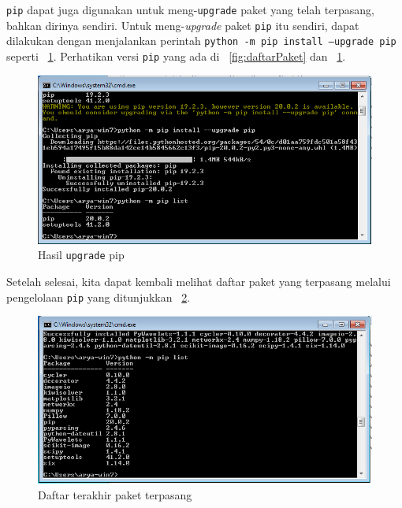\texttt{pip} dapat juga digunakan untuk meng-\texttt{upgrade} paket yang telah terpasang, bahkan dirinya sendiri. Untuk meng-\textit{upgrade} paket \texttt{pip} itu sendiri, dapat dilakukan dengan menjalankan perintah \texttt{python -m pip install --upgrade pip} seperti \figurename~\ref{fig:pipUpgrade}. Perhatikan versi \texttt{pip} yang ada di \figurename~\ref{fig:daftarPaket} dan \figurename~\ref{fig:pipUpgrade}.
 
\begin{figure}
  \begin{center}
    \includegraphics[scale=.5]{pics/pipList2.png}
    \caption{Hasil \texttt{upgrade} pip}
    \label{fig:pipUpgrade}
  \end{center}
\end{figure}


Setelah selesai, kita dapat kembali melihat daftar paket yang terpasang melalui pengelolaan \texttt{pip} yang ditunjukkan \figurename~\ref{fig:daftarPaket2}.

\begin{figure}[h!]
  \begin{center}
    \includegraphics[scale=.5]{pics/pipList3.png}
    \caption{Daftar terakhir paket terpasang}
    \label{fig:daftarPaket2}
  \end{center}
\end{figure}

